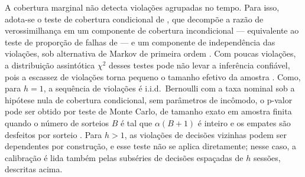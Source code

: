 A cobertura marginal não detecta violações agrupadas no tempo. Para isso, adota-se o teste de cobertura condicional de , que decompõe a razão de verossimilhança em um componente de cobertura incondicional --- equivalente ao teste de proporção de falhas de  --- e um componente de independência das violações, sob alternativa de Markov de primeira ordem \cite{CHRISTOFFERSENPELLETIER2004}. Com poucas violações, a distribuição assintótica \(\chi^2\) desses testes pode não levar a inferência confiável, pois a escassez de violações torna pequeno o tamanho efetivo da amostra \cite{CHRISTOFFERSENPELLETIER2004}. Como, para \(h = 1\), a sequência de violações é i.i.d.\ Bernoulli com a taxa nominal sob a hipótese nula de cobertura condicional, sem parâmetros de incômodo, o p-valor pode ser obtido por teste de Monte Carlo, de tamanho exato em amostra finita quando o número de sorteios \(B\) é tal que \(\alpha(B+1)\) é inteiro e os empates são desfeitos por sorteio \cite{DUFOUR2006,CHRISTOFFERSENPELLETIER2004}. Para \(h > 1\), as violações de decisões vizinhas podem ser dependentes por construção, e esse teste não se aplica diretamente; nesse caso, a calibração é lida também pelas subséries de decisões espaçadas de \(h\) sessões, descritas acima.

